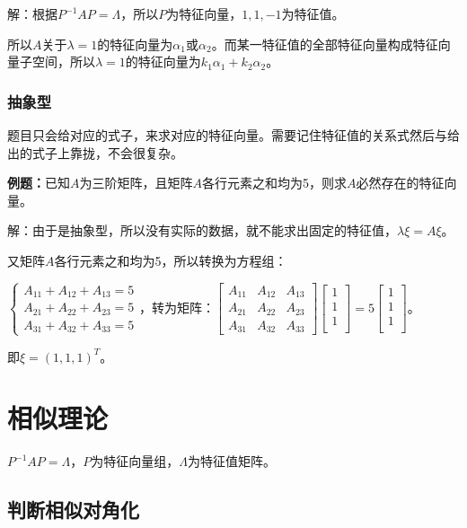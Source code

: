 \documentclass[UTF8, 12pt]{ctexart}
\begin{document}
解：根据$P^{-1}AP=\Lambda$，所以$P$为特征向量，$1,1,-1$为特征值。

所以$A$关于$\lambda=1$的特征向量为$\alpha_1$或$\alpha_2$。而某一特征值的全部特征向量构成特征向量子空间，所以$\lambda=1$的特征向量为$k_1\alpha_1+k_2\alpha_2$。

\subsubsection{抽象型}

题目只会给对应的式子，来求对应的特征向量。需要记住特征值的关系式然后与给出的式子上靠拢，不会很复杂。

\textbf{例题：}已知$A$为三阶矩阵，且矩阵$A$各行元素之和均为5，则求$A$必然存在的特征向量。

解：由于是抽象型，所以没有实际的数据，就不能求出固定的特征值，$\lambda\xi=A\xi$。

又矩阵$A$各行元素之和均为5，所以转换为方程组：\medskip

$\left\{\begin{array}{l}
    A_{11}+A_{12}+A_{13}=5 \\
    A_{21}+A_{22}+A_{23}=5 \\
    A_{31}+A_{32}+A_{33}=5
\end{array}\right.$，转为矩阵：$\left[\begin{array}{ccc}
    A_{11} & A_{12} & A_{13} \\
    A_{21} & A_{22} & A_{23} \\
    A_{31} & A_{32} & A_{33}
\end{array}\right]\left[\begin{array}{c}
    1 \\
    1 \\
    1 \\
\end{array}\right]=5\left[\begin{array}{c}
    1 \\
    1 \\
    1 \\
\end{array}\right]$。\medskip

即$\xi=(1,1,1)^T$。

\section{相似理论}

$P^{-1}AP=\Lambda$，$P$为特征向量组，$\Lambda$为特征值矩阵。

\subsection{判断相似对角化}
\end{document}
